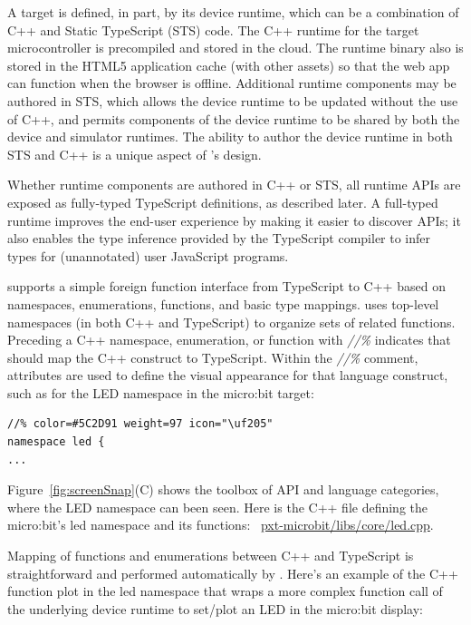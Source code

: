 A \MC target is defined, in part, by its device runtime, which can be a combination of C++ 
and Static TypeScript (STS) code. The C++ runtime for the target microcontroller is precompiled 
and stored in the cloud. The runtime binary also is stored in the HTML5 application cache (with 
other assets) so that the web app can function when the browser is offline. Additional runtime
components may be authored in STS, which allows the device runtime to be updated without the
use of C++, and permits components of the device runtime to be shared by both the device
and simulator runtimes. The ability to author the device runtime in both STS and C++ is
a unique aspect of \MC's design.

Whether runtime components are authored in C++ or STS, all runtime APIs are exposed as fully-typed
TypeScript definitions, as described later. A full-typed runtime improves the end-user experience 
by making it easier to discover APIs; it also enables the type inference provided by the TypeScript 
compiler to infer types for (unannotated) user JavaScript programs.

\MC supports a simple foreign function interface from TypeScript to C++ based on namespaces,
enumerations, functions, and basic type mappings. \MC uses top-level namespaces (in both C++ and
TypeScript) to organize sets of related functions.  Preceding a C++ namespace, enumeration, or function
with \emph{//\%} indicates that \MC should map the C++ construct to TypeScript.
Within the \emph{//\%} comment, attributes are used to define the visual appearance for that
language construct, such as for the LED namespace in the micro:bit target:

\begin{lstlisting}
//% color=#5C2D91 weight=97 icon="\uf205"
namespace led { 
...
\end{lstlisting}

Figure~\ref{fig:screenSnap}(C) shows the toolbox of API and language categories, where the LED
namespace can been seen. Here is the C++ file defining the micro:bit's led namespace and its functions:
~\href{https://github.com/Microsoft/pxt-microbit/blob/master/libs/core/led.cpp}{pxt-microbit/libs/core/led.cpp}.

Mapping of functions and enumerations between C++ and TypeScript is straightforward
and performed automatically by \MC. 
Here's an example of the C++ function plot in the led namespace that wraps a more
complex function call of the underlying device runtime to set/plot an LED in the micro:bit display:


